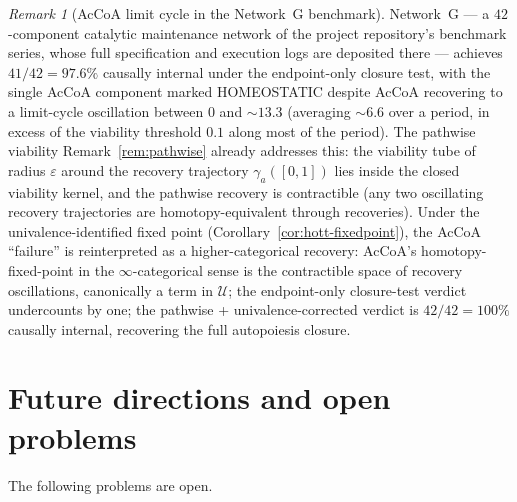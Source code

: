 \documentclass[11pt,a4paper]{article}
\theoremstyle{plain}
\theoremstyle{definition}
\theoremstyle{remark}
\newtheorem{remark}[theorem]{Remark}
\begin{document}
\begin{remark}[AcCoA limit cycle in the Network~G benchmark]
\label{rem:netG-accola-cycle}
Network~G --- a $42$-component catalytic maintenance network of the
project repository's benchmark series, whose full specification and
execution logs are deposited there --- achieves $41/42 = 97.6\%$
causally internal under the endpoint-only closure test, with the single
AcCoA component marked HOMEOSTATIC despite AcCoA recovering to a
limit-cycle oscillation between $0$ and $\sim 13.3$ (averaging $\sim
6.6$ over a period, in excess of the viability threshold $0.1$ along
most of the period). The pathwise viability Remark~\ref{rem:pathwise}
already addresses this: the viability tube of radius $\varepsilon$
around the recovery trajectory $\gamma_a([0,1])$ lies inside the closed
viability kernel, and the pathwise recovery is contractible (any two
oscillating recovery trajectories are homotopy-equivalent through
recoveries). Under the univalence-identified fixed point
(Corollary~\ref{cor:hott-fixedpoint}), the AcCoA ``failure'' is
reinterpreted as a higher-categorical recovery: AcCoA's
homotopy-fixed-point in the $\infty$-categorical sense is the
contractible space of recovery oscillations, canonically a term in
$\mathcal{U}$; the endpoint-only closure-test verdict undercounts by
one; the pathwise + univalence-corrected verdict is $42/42 = 100\%$
causally internal, recovering the full autopoiesis closure.
\end{remark}



\section{Future directions and open problems}\label{sec:future}

The following problems are open.
\end{document}
